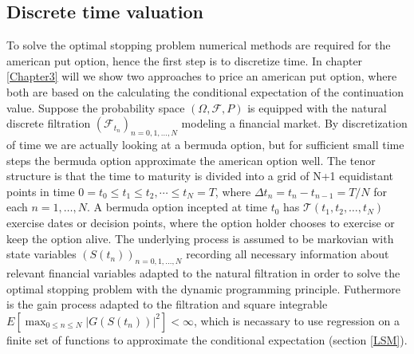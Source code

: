 \subsection{Discrete time valuation}\label{DiscreteValueFramework}
To solve the optimal stopping problem numerical methods are required for the american put option, hence the first step is to discretize time. In chapter \ref{Chapter3} will we show two approaches to price an american put option, where both are based on the calculating the conditional expectation of the continuation value. Suppose the probability space $(\Omega, \mathcal{F}, P)$ is equipped with the natural discrete filtration $(\mathcal{F}_{t_n})_{n=0,1,\ldots,N}$ modeling a financial market. By discretization of time we are actually looking at a bermuda option, but for sufficient small time steps the bermuda option approximate the american option well. The tenor structure is that the time to maturity is divided into a grid of N+1 equidistant points in time $0=t_0\leq t_1\leq t_2, \cdots \leq t_N=T$, where $\Delta t_n = t_n-t_{n-1}=T/N$ for each $n=1, \ldots, N$. A bermuda option incepted at time $t_0$ has $\mathcal{T}(t_1,t_2,\ldots,t_N)$ exercise dates or decision points, where the option holder chooses to exercise or keep the option alive. The underlying process is assumed to be markovian with state variables $(S(t_n))_{n=0,1,\ldots,N}$ recording all necessary information about relevant financial variables adapted to the natural filtration in order to solve the optimal stopping problem with the dynamic programming principle. Futhermore is the gain process adapted to the filtration and square integrable $E[\max_{0\leq n \leq N} |G(S(t_n))|^2]<\infty$, which is necassary to use regression on a finite set of functions to approximate the conditional expectation (section \ref{LSM}).\\

